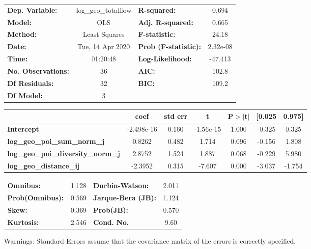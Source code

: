 \begin{center}
\begin{tabular}{lclc}
\toprule
\textbf{Dep. Variable:}                    & log\_geo\_totalflow & \textbf{  R-squared:         } &     0.694   \\
\textbf{Model:}                            &         OLS         & \textbf{  Adj. R-squared:    } &     0.665   \\
\textbf{Method:}                           &    Least Squares    & \textbf{  F-statistic:       } &     24.18   \\
\textbf{Date:}                             &   Tue, 14 Apr 2020  & \textbf{  Prob (F-statistic):} &  2.32e-08   \\
\textbf{Time:}                             &       01:20:48      & \textbf{  Log-Likelihood:    } &   -47.413   \\
\textbf{No. Observations:}                 &            36       & \textbf{  AIC:               } &     102.8   \\
\textbf{Df Residuals:}                     &            32       & \textbf{  BIC:               } &     109.2   \\
\textbf{Df Model:}                         &             3       & \textbf{                     } &             \\
\bottomrule
\end{tabular}
\begin{tabular}{lcccccc}
                                           & \textbf{coef} & \textbf{std err} & \textbf{t} & \textbf{P$> |$t$|$} & \textbf{[0.025} & \textbf{0.975]}  \\
\midrule
\textbf{Intercept}                         &   -2.498e-16  &        0.160     & -1.56e-15  &         1.000        &       -0.325    &        0.325     \\
\textbf{log\_geo\_poi\_sum\_norm\_j}       &       0.8262  &        0.482     &     1.714  &         0.096        &       -0.156    &        1.808     \\
\textbf{log\_geo\_poi\_diversity\_norm\_j} &       2.8752  &        1.524     &     1.887  &         0.068        &       -0.229    &        5.980     \\
\textbf{log\_geo\_distance\_ij}            &      -2.3952  &        0.315     &    -7.607  &         0.000        &       -3.037    &       -1.754     \\
\bottomrule
\end{tabular}
\begin{tabular}{lclc}
\textbf{Omnibus:}       &  1.128 & \textbf{  Durbin-Watson:     } &    2.011  \\
\textbf{Prob(Omnibus):} &  0.569 & \textbf{  Jarque-Bera (JB):  } &    1.124  \\
\textbf{Skew:}          &  0.369 & \textbf{  Prob(JB):          } &    0.570  \\
\textbf{Kurtosis:}      &  2.546 & \textbf{  Cond. No.          } &     9.60  \\
\bottomrule
\end{tabular}
\end{center}

Warnings: \newline
 [1] Standard Errors assume that the covariance matrix of the errors is correctly specified.
